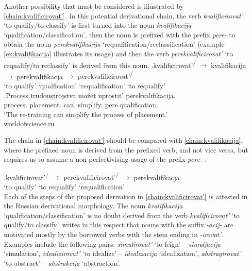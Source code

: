 Another possibility that must be considered is illustrated by \ref{chain:kvalificirovat'}. In this potential derivational chain, the verb \textit{kvalificirovat'} `to qualify/to classify' is first turned into the noun \textit{kvalifikacija} `qualification\slash classification', then the noun is prefixed with the prefix \textit{pere-}   to obtain the noun \textit{perekvalifikacija}  `requalification/reclassification' (example \ref{ex:kvalifikacija} illustrates its usage) and then the verb \textit{perekvalificirovat'} `to requalify/to reclassify' is derived from this noun. 
\exg.\label{chain:kvalificirovat'}kvalificirovat'\textsuperscript{\PF\slash\IPF} {$\rightarrow$} kvalifikacija {$\rightarrow$} perekvalifikacja {$\rightarrow$} {perekvalificirovat'\textsuperscript{\PF\slash\IPF}}\\
{`to qualify'} {} {`qualfication'} {} {`requalification'} {} {`to requalify'}\\

\exg.\label{ex:kvalifikacija}Process trudoustrojstva mo\v{z}et uprostit' perekvalifikacija.\\
process. placement. can. simplify. pere.qualification.\\
\trans `The re-training can simplify the process of placement.'\\\hbox{}\hfill\hbox{\url{worldofscience.ru}}

The chain in \ref{chain:kvalificirovat'} should be compared with \ref{chain:kvalifikacija}, where the prefixed noun  is derived from the prefixed verb, and not vice versa, but requires us to assume a non-perfectivising   usage of the prefix \textit{pere-}  .

\exg.\label{chain:kvalifikacija}kvalificirovat'\textsuperscript{\PF\slash\IPF} {$\rightarrow$} {perekvalificirovat'\textsuperscript{\PF\slash\IPF}} {$\rightarrow$} perekvalifikacja\\
{`to qualify'} {} {`to requalify'} {} {`requalification'}\\

Each of the steps of the proposed derivation in \ref{chain:kvalificirovat'} is attested in the Russian derivational morphology. The noun \textit{kvalifikacija} `qualification\slash classification' is no doubt derived from the verb \textit{kvalificirovat'} `to qualify/to classify'. \citet{Shvedova:82} writes in this respect that nouns with the suffix \textit{-acij-} are motivated mostly by the borrowed verbs with the stem ending in \textit{-irovat'}. Examples \citep[taken from][159]{Shvedova:82} include the following pairs: \textit{simulirovat'} `to feign' -- \textit{simuljacija} `simulation', \textit{idealizirovat'} `to idealize'  -- \textit{idealizacija} `idealization', \textit{abstragirovat'} `to abstract' -- \textit{abstrakcija} `abstraction'.

